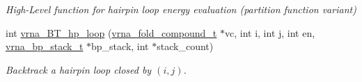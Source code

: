 \begin{DoxyCompactItemize}
\begin{DoxyCompactList}\small\item\em High-\/\+Level function for hairpin loop energy evaluation (partition function variant) \end{DoxyCompactList}\item 
int \hyperlink{group__loops_ga6c4ba14d24f716d0ca9021771357e903}{vrna\+\_\+\+B\+T\+\_\+hp\+\_\+loop} (\hyperlink{group__fold__compound_ga1b0cef17fd40466cef5968eaeeff6166}{vrna\+\_\+fold\+\_\+compound\+\_\+t} $\ast$vc, int i, int j, int en, \hyperlink{group__data__structures_gaa651bda42e7692f08cb603cd6834b0ee}{vrna\+\_\+bp\+\_\+stack\+\_\+t} $\ast$bp\+\_\+stack, int $\ast$stack\+\_\+count)
\begin{DoxyCompactList}\small\item\em Backtrack a hairpin loop closed by $ (i,j) $. \end{DoxyCompactList}\end{DoxyCompactItemize}
